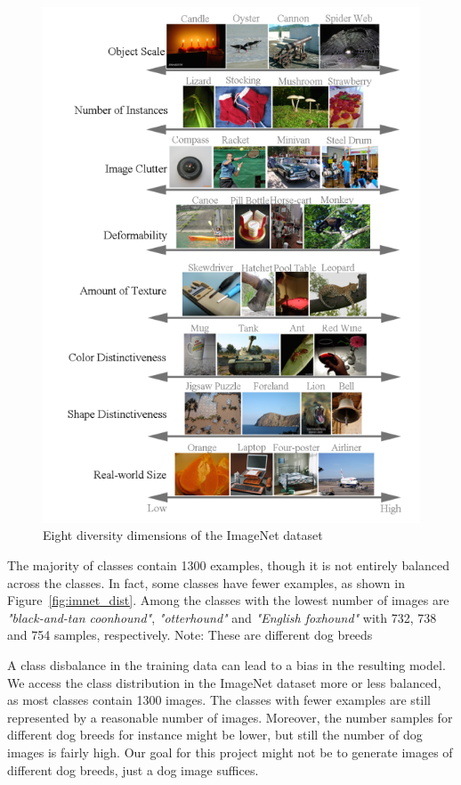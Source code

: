 \begin{figure}
    \centering
    \includegraphics[width=\textwidth]{../../sample_images/imnet_dimension}
    \caption{Eight diversity dimensions of the ImageNet dataset~\cite{imagenet_breakdown}}
    \label{fig:imnet_dimensions}
\end{figure}

The majority of classes contain 1300 examples, though it is not entirely balanced across the classes.
In fact, some classes have fewer examples, as shown in Figure~\ref{fig:imnet_dist}.
Among the classes with the lowest number of images are \textit{"black-and-tan coonhound"}, \textit{"otterhound"} and
\textit{"English foxhound"} with 732, 738 and 754 samples, respectively.
Note: These are different dog breeds

A class disbalance in the training data can lead to a bias in the resulting model.
We access the class distribution in the ImageNet dataset more or less balanced, as most classes contain 1300 images.
The classes with fewer examples are still represented by a reasonable number of images.
Moreover, the number samples for different dog breeds for instance might be lower, but still the number of dog images is fairly high.
Our goal for this project might not be to generate
images of different dog breeds, just a dog image suffices.

